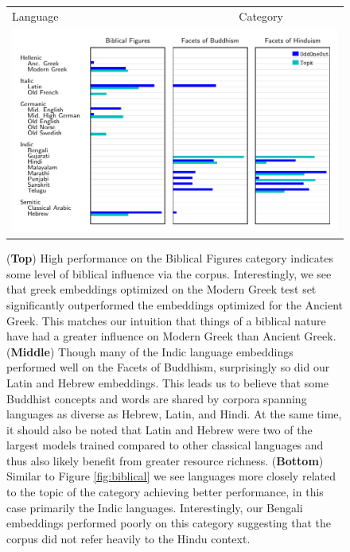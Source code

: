 \documentclass[11pt,a4paper]{article}
\begin{document}
\begin{figure}
\centering
\begin{tabular}{lccc}
 \multicolumn{3}{l}{Language} &\multicolumn{1}{c}{\hspace{4em} Category} \\ 
\multicolumn{4}{l}{\includegraphics{lct-biblical.pdf}} \\
\end{tabular}
\caption{
    (\textbf{Top})
    High performance on the Biblical Figures category indicates some level of biblical influence via the corpus. 
    Interestingly, we see that greek embeddings optimized on the Modern Greek test set significantly outperformed the embeddings optimized for the Ancient Greek. 
    This matches our intuition that things of a biblical nature have had a greater influence on Modern Greek than Ancient Greek.
    (\textbf{Middle})
    Though many of the Indic language embeddings performed well on the Facets of Buddhism, 
    surprisingly so did our Latin and Hebrew embeddings. 
    This leads us to believe that some Buddhist concepts and words are shared by corpora spanning languages as diverse as Hebrew, Latin, and Hindi. 
    At the same time, it should also be noted that Latin and Hebrew were two of the largest models trained compared to other classical languages and thus also likely benefit from greater resource richness.
    (\textbf{Bottom})
    Similar to Figure \ref{fig:biblical} we see languages more closely related to the topic of the category achieving better performance, in this case primarily the Indic languages. 
    Interestingly, our Bengali embeddings performed poorly on this category suggesting that the corpus did not refer heavily to the Hindu context.
}
\label{fig:downstream}
\end{figure}
\end{document}
